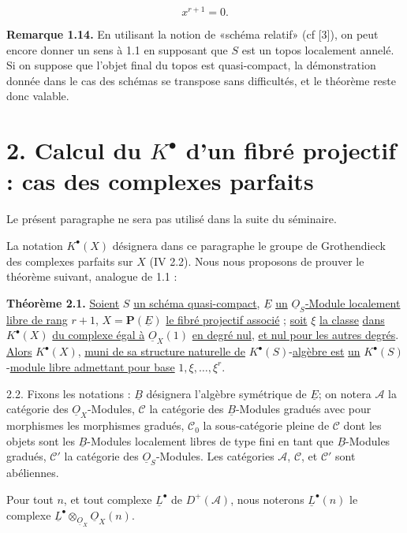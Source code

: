 
\begin{equation}\tag{1.13.2}
  x^{r+1}=0.
\end{equation}

\textbf{Remarque 1.14.} En utilisant la notion de «schéma relatif» (cf [3]), on peut encore donner un sens à 1.1 en supposant que \(S\) est un topos localement annelé. Si on suppose que l'objet final du topos est quasi-compact, la démonstration donnée dans le cas des schémas se transpose sans difficultés, et le théorème reste donc valable.

\section*{2. Calcul du \(K^{\bullet}\) d'un fibré projectif : cas des complexes parfaits}


Le présent paragraphe ne sera pas utilisé dans la suite du séminaire.

La notation \(K^{\bullet}(X)\) désignera dans ce paragraphe le groupe de Grothendieck des complexes parfaits sur \(X\) (IV 2.2). Nous nous proposons de prouver le théorème suivant, analogue de 1.1 :

\textbf{Théorème 2.1.} \uline{Soient} \(S\) \uline{un schéma quasi-compact}, \(\underline{E}\) \uline{un} \(\underline{O}_S\)\uline{-Module localement libre de rang} \(r+1\), \(X=\mathbf P(\underline{E})\) \uline{le fibré projectif associé} ; \uline{soit} \(\xi\) \uline{la classe} \uline{dans} \(K^{\bullet}(X)\) \uline{du complexe égal à} \(\underline{O}_X(1)\) \uline{en degré nul}, \uline{et nul pour les autres degrés}. \uline{Alors} \(K^{\bullet}(X)\), \uline{muni de sa structure naturelle de} \(K^{\bullet}(S)\)-\uline{algèbre est} \uline{un} \(K^{\bullet}(S)\)-\uline{module libre admettant pour base} \(1,\xi,\ldots,\xi^r\).

2.2. Fixons les notations : \(\underline{B}\) désignera l'algèbre symétrique de \(\underline{E}\); on notera \(\mathcal A\) la catégorie des \(\underline{O}_X\)-Modules, \(\mathcal C\) la catégorie des \(\underline{B}\)-Modules gradués avec pour morphismes les morphismes gradués, \(\mathcal C_0\) la sous-catégorie pleine de \(\mathcal C\) dont les objets sont les \(\underline{B}\)-Modules localement libres de type fini en tant que \(\underline{B}\)-Modules gradués, \(\mathcal C'\) la catégorie des \(\underline{O}_S\)-Modules. Les catégories \(\mathcal A\), \(\mathcal C\), et \(\mathcal C'\) sont abéliennes.

Pour tout \(n\), et tout complexe \(\underline{L}^\bullet\) de \(D^+(\mathcal A)\), nous noterons \(\underline{L}^\bullet(n)\) le complexe \(\underline{L}^\bullet\otimes_{\underline{O}_X}\underline{O}_X(n)\).

